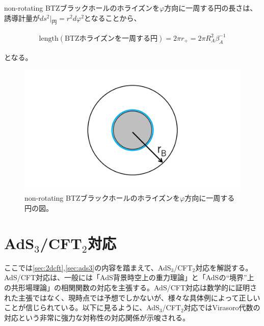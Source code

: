 non-rotating BTZブラックホールのホライズンを$\varphi$方向に一周する円の長さは、誘導計量が$ds^2|_\text{円}=r^2d\varphi^2$となることから、
\begin{oframed}
\begin{align}
\text{length}(\text{BTZホライズンを一周する円})=2\pi r_+=2\pi R_A^2 \beta_A^{-1}\label{btzwindingcurvelength}
\end{align}
\end{oframed}
となる。
\begin{figure}[h]
	\centering
	\includegraphics[width=0.7\linewidth]{BTZwindingcurve.pdf}
	\caption{non-rotating BTZブラックホールのホライズンを$\varphi$方向に一周する円の図。}
	\label{fig:BTZwindingcurve}
\end{figure}


\section{AdS$_3$/CFT$_2$対応}\label{sec:adscft}
ここでは\ref{sec:2dcft},\ref{sec:ads3}の内容を踏まえて、AdS$_3$/CFT$_2$対応を解説する。AdS/CFT対応は、一般には「AdS背景時空上の重力理論」と「AdSの``境界''上の共形場理論」の相関関数の対応を主張する。AdS/CFT対応は数学的に証明された主張ではなく、現時点では予想でしかないが、様々な具体例によって正しいことが信じられている。以下に見るように、AdS$_3$/CFT$_2$対応ではVirasoro代数の対応という非常に強力な対称性の対応関係が示唆される。

